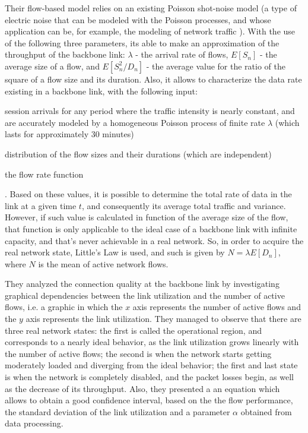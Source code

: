 \documentclass[runningheads,a4paper]{llncs}
\begin{document}
Their flow-based model relies on an existing Poisson shot-noise model (a type of electric noise that can be modeled with the Poisson processes, and whose application can be, for example, the modeling of network traffic \cite{kluppelberg1995explosive}). With the use of the following three parameters, its able to make an approximation of the throughput of the backbone link: $ \lambda $ - the arrival rate of flows, $ E[S_{n}] $ - the average size of a flow, and $ E[S_{n}^2 / D_{n}] $ - the average value for the ratio of the square of a flow size and its duration. Also, it allows to characterize the data rate existing in a backbone link, with the following input: 
\begin{enumerate*}
\item session arrivals for any period where the traffic intensity is nearly constant, and are accurately modeled by a homogeneous Poisson process of finite rate $ \lambda $ (which lasts for approximately 30 minutes)
\item distribution of the flow sizes and their durations (which are independent)
\item the flow rate function
\end{enumerate*}
. Based on these values, it is possible to determine the total rate of data in the link at a given time $ t $, and consequently its average total traffic and variance. However, if such value is calculated in function of the average size of the flow, that function is only applicable to the ideal case of a backbone link with infinite capacity, and that's never achievable in a real network. So, in order to acquire the real network state, Little's Law is used, and such is given by $ N = \lambda E[D_{n}] $, where $ N $ is the mean of active network flows.

They analyzed the connection quality at the backbone link by investigating graphical dependencies between the link utilization and the number of active flows, i.e. a graphic in which the $ x $ axis represents the number of active flows and the $ y $ axis represents the link utilization. They managed to observe that there are three real network states: the first is called the operational region, and corresponds to a nearly ideal behavior, as the link utilization grows linearly with the number of active flows; the second is when the network starts getting moderately loaded and diverging from the ideal behavior; the first and last state is when the network is completely disabled, and the packet losses begin, as well as the decrease of its throughput. Also, they presented a an equation which allows to obtain a good confidence interval, based on the the flow performance, the standard deviation of the link utilization and a parameter $ \alpha $ obtained from data processing. 
\end{document}
